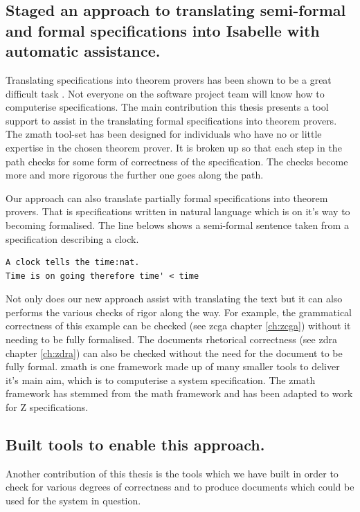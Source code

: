 \subsection{Staged an approach to translating semi-formal and formal specifications into Isabelle with automatic assistance.}

Translating specifications into theorem provers has been shown to be a great
difficult task \cite{johnharrisonslides}. Not everyone on the software project
team will know how to computerise specifications. The main contribution this
thesis presents a tool support to assist in the translating formal
specifications into theorem provers. The \gls{zmath} tool-set has been designed
for individuals who have no or little expertise in the chosen theorem prover. It
is broken up so that each step in the path checks for some form of correctness
of the specification. The checks become more and more rigorous the further one
goes along the path.

Our approach can also translate partially formal specifications into theorem
provers. That is specifications written in natural language which is on it's way
to becoming formalised. The line belows shows a semi-formal sentence taken from
a specification describing a clock.

\begin{verbatim}
A clock tells the time:nat.
Time is on going therefore time' < time
\end{verbatim}

Not only does our new approach assist with translating the text but it can also
performs the various checks of rigor along the way. For example, the grammatical
correctness of this example can be checked (see \gls{zcga} chapter
\ref{ch:zcga}) without it needing to be fully formalised. The documents
rhetorical correctness (see \gls{zdra} chapter \ref{ch:zdra}) can also be
checked without the need for the document to be fully formal. \Gls{zmath} is one
framework made up of many smaller tools to deliver it's main aim, which is to
computerise a system specification. The \gls{zmath} framework has stemmed from
the \gls{math} framework \cite{mathintomizar} and has been adapted to work for Z
specifications.

\subsection{Built tools to enable this approach.}

Another contribution of this thesis is the tools which we have built in order to
check for various degrees of correctness and to produce documents which could be
used for the system in question.

